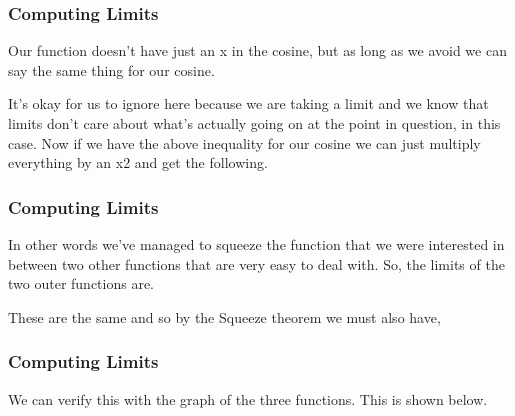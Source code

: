 \documentclass{beamer}
\begin{document}
\begin{frame}[fragile]
	\frametitle{Computing Limits}
	\Large
Our function doesn’t have just an x in the cosine, but as long as we avoid  we can say the same thing for our cosine.

It’s okay for us to ignore  here because we are taking a limit and we know that limits don’t care about what’s actually going on at the point in question,  in this case.
Now if we have the above inequality for our cosine we can just multiply everything by an x2 and get the following.

\end{frame}
\begin{frame}[fragile]
	\frametitle{Computing Limits}
	\Large
In other words we’ve managed to squeeze the function that we were interested in between two other functions that are very easy to deal with.  So, the limits of the two outer functions are.


These are the same and so by the Squeeze theorem we must also have,
\end{frame}
\begin{frame}[fragile]
	\frametitle{Computing Limits}
	\Large

We can verify this with the graph of the three functions.  This is shown below.

\end{frame}
\end{document}
